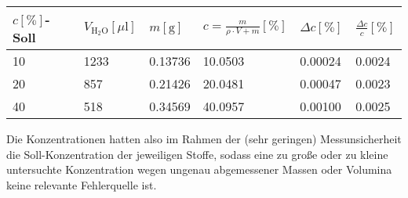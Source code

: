 \documentclass[11pt,a4paper,oneside]{scrartcl}
\begin{document}
\begin{table}[!ht]
    \centering
    \begin{tabular}{llllll}
    \hline
        $c [\%]$-Soll & $V_{\mathrm{H_2O}} [\mu \mathrm l]$ & $m [\mathrm g]$ & $c=\frac{m}{\rho\cdot V+m}[\%]$ & $\Delta c[\%]$ & $\frac{\Delta c}{c}[\%]$ \\ \hline
        10 & 1233 & 0.13736 & 10.0503 & 0.00024 & 0.0024 \\ 
        20 & 857 & 0.21426 & 20.0481 & 0.00047 & 0.0023 \\ 
        40 & 518 & 0.34569 & 40.0957 & 0.00100 & 0.0025 \\ \hline
    \end{tabular}
\end{table}
Die Konzentrationen hatten also im Rahmen der (sehr geringen) Messunsicherheit die Soll-Konzentration der jeweiligen Stoffe, sodass eine zu große oder zu kleine untersuchte Konzentration wegen ungenau abgemessener Massen oder Volumina keine relevante Fehlerquelle ist.
\end{document}
